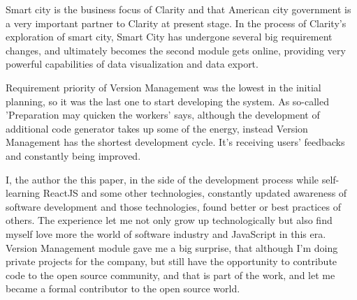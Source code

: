 Smart city is the business focus of Clarity and that American city government is a very important partner to Clarity at present stage. In the process of Clarity's exploration of smart city, Smart City has undergone several big requirement changes, and ultimately becomes the second module gets online, providing very powerful capabilities of data visualization and data export.

Requirement priority of Version Management was the lowest in the initial planning, so it was the last one to start developing the system. As so-called 'Preparation may quicken the workers' says, although the development of additional code generator takes up some of the energy, instead Version Management has the shortest development cycle. It's receiving users' feedbacks and constantly being improved.

I, the author the this paper, in the side of the development process while self-learning ReactJS and some other technologies, constantly updated awareness of software development and those technologies, found better or best practices of others. The experience let me not only grow up technologically but also find myself love more the world of software industry and JavaScript in this era. Version Management module gave me a big surprise, that although I'm doing private projects for the company, but still have the opportunity to contribute code to the open source community, and that is part of the work, and let me became a formal contributor to the open source world.
